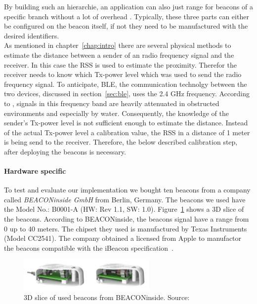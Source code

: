 By building such an hierarchie, an application can also just range for beacons of a specific branch without a lot of overhead \cite{apple:getting_started, binside:ds}.
Typically, these three parts can either be configured on the beacon itself, if not they need to be manufactured with the desired identifiers.\\
\newline
As mentioned in chapter~\ref{chap:intro} there are several physical methods to estimate the distance between a sender of an radio frequency signal and the receiver.
In this case the \acl{RSS} is used to estimate the proximity.
Therefor the receiver needs to know which Tx-power level which was used to send the radio frequency signal.
To anticipate, \acs{BLE}, the communication technolgy between the two devices, discussed in section~\ref{sec:ble}, uses the 2.4 GHz frequency.
According to \cite{apple:getting_started, binside:ds}, signals in this frequency band are heavily attenuated in obstructed environments and especially by water.
Consequently, the knowledge of the sender's Tx-power level is not sufficient enough to estimate the distance.
Instead of the actual Tx-power level a calibration value, the \acs{RSS} in a distance of 1 meter is being send to the receiver.
Therefore, the below described calibration step, after deploying the beacons is necessary.

\paragraph{Hardware specific} To test and evaluate our implementation we bought ten beacons from a company called \textit{BEACONinside GmbH} from Berlin, Germany. The beacons we used have the Model No.: B0001-A (HW: Rev 1.1, SW: 1.0). Figure~\ref{fig:bi:beacons} shows a 3D slice of the beacons.
According to BEACONinside, the beacons signal have a range from 0 up to 40 meters.
The chipset they used is manufactured by Texas Instruments (Model CC2541).
The company obtained a licensed from Apple to manufactor the beacons compatible with the iBeacon specification~\cite{binside:ds}.

\begin{figure}
\includegraphics[width=0.6\textwidth]{figures/BEACONinside_beacons}
\caption{3D slice of used beacons from BEACONinside. Source:~\cite{binside:ds}}
\label{fig:bi:beacons}
\end{figure}

